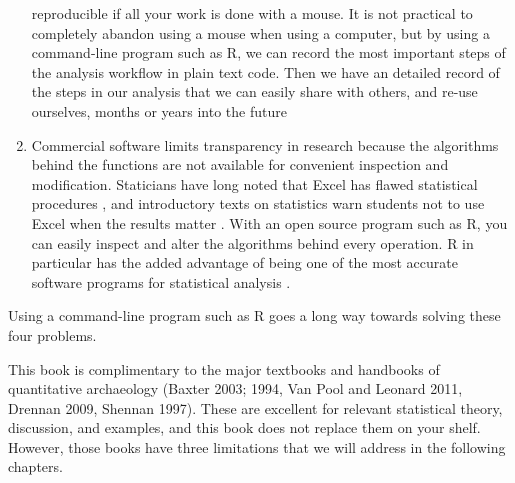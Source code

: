 \documentclass[]{book}
\begin{document}
\begin{enumerate}
  reproducible if all your work is done with a mouse. It is not
  practical to completely abandon using a mouse when using a computer,
  but by using a command-line program such as R, we can record the most
  important steps of the analysis workflow in plain text code. Then we
  have an detailed record of the steps in our analysis that we can
  easily share with others, and re-use ourselves, months or years into
  the future
\item
  Commercial software limits transparency in research because the
  algorithms behind the functions are not available for convenient
  inspection and modification. Staticians have long noted that Excel has
  flawed statistical procedures
  \citep[\citet{yalta2008accuracy}]{mccullough2008accuracy}, and
  introductory texts on statistics warn students not to use Excel when
  the results matter \citep[eg.][]{keller2000applied}. With an open
  source program such as R, you can easily inspect and alter the
  algorithms behind every operation. R in particular has the added
  advantage of being one of the most accurate software programs for
  statistical analysis
  \citep[\citet{keeling2007comparative}]{almiron2009}.
\end{enumerate}

Using a command-line program such as R goes a long way towards solving
these four problems.

This book is complimentary to the major textbooks and handbooks of
quantitative archaeology (Baxter 2003; 1994, Van Pool and Leonard 2011,
Drennan 2009, Shennan 1997). These are excellent for relevant
statistical theory, discussion, and examples, and this book does not
replace them on your shelf. However, those books have three limitations
that we will address in the following chapters.
\end{document}
